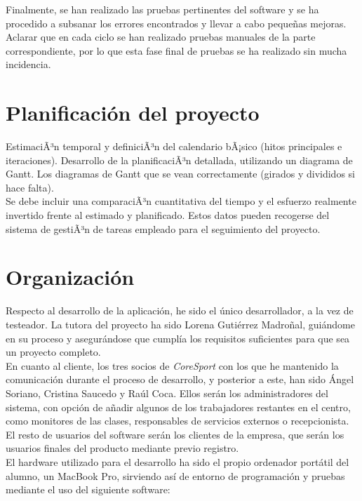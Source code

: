Finalmente, se han realizado las pruebas pertinentes del software y se ha procedido a subsanar los errores encontrados y llevar a cabo pequeñas mejoras. Aclarar que en cada ciclo se han realizado pruebas manuales de la parte correspondiente, por lo que esta fase final de pruebas se ha realizado sin mucha incidencia.


\section{Planificación del proyecto}
EstimaciÃ³n temporal y definiciÃ³n del calendario bÃ¡sico (hitos principales e iteraciones). Desarrollo de la planificaciÃ³n detallada, utilizando un diagrama de Gantt. Los diagramas de Gantt que se vean correctamente (girados y divididos si hace falta).\\

Se debe incluir una comparaciÃ³n cuantitativa del tiempo y el esfuerzo realmente invertido frente al estimado y planificado. Estos datos pueden recogerse del sistema de gestiÃ³n de tareas empleado para el seguimiento del proyecto.

\section{Organización}

Respecto al desarrollo de la aplicación, he sido el único desarrollador, a la vez de testeador. La tutora del proyecto ha sido Lorena Gutiérrez Madroñal, guiándome en su proceso y asegurándose que cumplía los requisitos suficientes para que sea un proyecto completo. 
\\

En cuanto al cliente, los tres socios de \textsl{CoreSport} con los que he mantenido la comunicación durante el proceso de desarrollo, y posterior a este, han sido Ángel Soriano, Cristina Saucedo y Raúl Coca. Ellos serán los administradores del sistema, con opción de añadir algunos de los trabajadores restantes en el centro, como monitores de las clases, responsables de servicios externos o recepcionista. 
\\

El resto de usuarios del software serán los clientes de la empresa, que serán los usuarios finales del producto mediante previo registro.
\\

El hardware utilizado para el desarrollo ha sido el propio ordenador portátil del alumno, un MacBook Pro, sirviendo así de entorno de programación y pruebas mediante el uso del siguiente software: 

